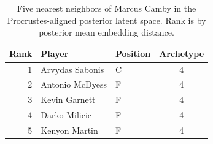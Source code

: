 \begin{table}[htbp]
  \centering\small
  \begin{tabular}{rllc}
    \toprule
    Rank & Player & Position & Archetype \\
    \midrule
    1 & Arvydas Sabonis & C & 4 \\
    2 & Antonio McDyess & F & 4 \\
    3 & Kevin Garnett & F & 4 \\
    4 & Darko Milicic & F & 4 \\
    5 & Kenyon Martin & F & 4 \\
    \bottomrule
  \end{tabular}
  \caption{Five nearest neighbors of Marcus Camby in the Procrustes-aligned posterior latent space. Rank is by posterior mean embedding distance.}
  \label{tab:Marcus_Camby_neighbors}
\end{table}

